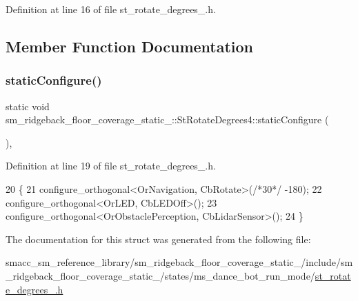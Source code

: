 Definition at line 16 of file st\+\_\+rotate\+\_\+degrees\+\_.\+h.



\subsection{Member Function Documentation}
\mbox{\label{structsm__ridgeback__floor__coverage__static__1_1_1StRotateDegrees4_ac005f396387ff36761815476ebf8c965}} 
\subsubsection{\texorpdfstring{static\+Configure()}{staticConfigure()}}
{\footnotesize\ttfamily static void sm\+\_\+ridgeback\+\_\+floor\+\_\+coverage\+\_\+static\+\_\+::\+St\+Rotate\+Degrees4\+::static\+Configure (\begin{DoxyParamCaption}{ }\end{DoxyParamCaption})\hspace{0.3cm}{\ttfamily [inline]}, {\ttfamily [static]}}



Definition at line 19 of file st\+\_\+rotate\+\_\+degrees\+\_.\+h.


\begin{DoxyCode}
20     \{
21       configure\_orthogonal<OrNavigation, CbRotate>(\textcolor{comment}{/*30*/} -180);
22       configure\_orthogonal<OrLED, CbLEDOff>();
23       configure\_orthogonal<OrObstaclePerception, CbLidarSensor>();
24     \}
\end{DoxyCode}


The documentation for this struct was generated from the following file\+:\begin{DoxyCompactItemize}
\item 
smacc\+\_\+sm\+\_\+reference\+\_\+library/sm\+\_\+ridgeback\+\_\+floor\+\_\+coverage\+\_\+static\+\_/include/sm\+\_\+ridgeback\+\_\+floor\+\_\+coverage\+\_\+static\+\_/states/ms\+\_\+dance\+\_\+bot\+\_\+run\+\_\+mode/\hyperlink{sm__ridgeback__floor__coverage__static__1_2include_2sm__ridgeback__floor__coverage__static__1_2sbe0fe92591f145d1c6082724d468d8b7}{st\+\_\+rotate\+\_\+degrees\+\_.\+h}\end{DoxyCompactItemize}
